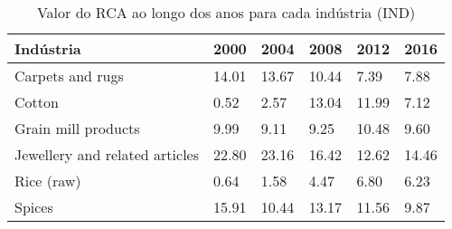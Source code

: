 \begin{table}
\centering
\caption{Valor do RCA ao longo dos anos para cada indústria (IND)}
\begin{tabular}{p{6cm}p{1.5cm}p{1.5cm}p{1.5cm}p{1.5cm}p{1.5cm}}
\toprule
                     Indústria &  2000 &  2004 &  2008 &  2012 &  2016 \\
\midrule
              Carpets and rugs & 14.01 & 13.67 & 10.44 &  7.39 &  7.88 \\
                        Cotton &  0.52 &  2.57 & 13.04 & 11.99 &  7.12 \\
           Grain mill products &  9.99 &  9.11 &  9.25 & 10.48 &  9.60 \\
Jewellery and related articles & 22.80 & 23.16 & 16.42 & 12.62 & 14.46 \\
                    Rice (raw) &  0.64 &  1.58 &  4.47 &  6.80 &  6.23 \\
                        Spices & 15.91 & 10.44 & 13.17 & 11.56 &  9.87 \\
\bottomrule
\end{tabular}
\end{table}
